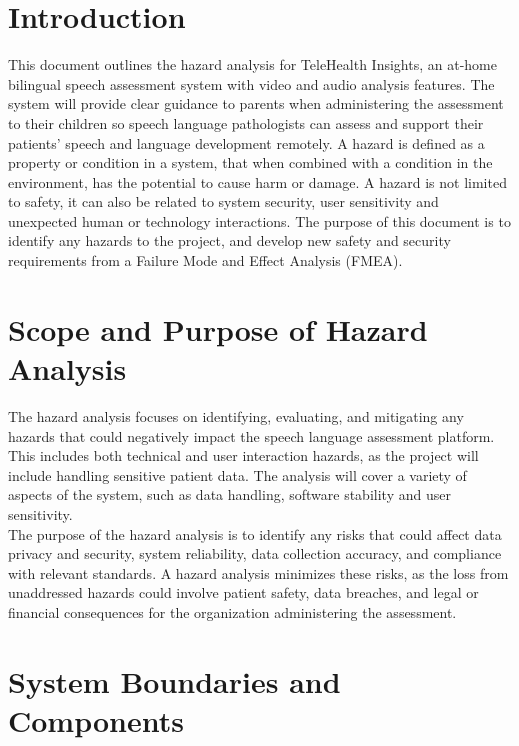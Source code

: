 \documentclass{article}
\begin{document}
\section{Introduction}

\hspace{1.5em} This document outlines the hazard analysis for TeleHealth Insights, an at-home bilingual speech 
assessment system with video and audio analysis features. The system will provide clear guidance to
parents when administering the assessment to their children so speech language pathologists can assess and support
their patients' speech and language development remotely. A hazard is defined as a 
property or condition in a system, that when combined with a condition in the environment, has the potential to cause harm or 
damage. A hazard is not limited to safety, it can also be related to system security, user sensitivity and 
unexpected human or technology interactions. The purpose of this document is to identify any hazards to the project, and 
develop new safety and security requirements from a Failure Mode and Effect Analysis (FMEA).

\section{Scope and Purpose of Hazard Analysis}

\hspace{1.5em} The hazard analysis focuses on identifying, evaluating, and mitigating any hazards that could negatively 
impact the speech language assessment platform. This includes both technical and user interaction hazards,
as the project will include handling sensitive patient data. The analysis will cover a variety of aspects of the system, such as 
data handling, software stability and user sensitivity. \\
\indent The purpose of the hazard analysis is to identify any risks that could 
affect data privacy and security, system reliability, data collection accuracy, and compliance with relevant standards. A 
hazard analysis minimizes these risks, as the loss from unaddressed hazards could involve patient safety, data breaches, 
and legal or financial consequences for the organization administering the assessment.

\section{System Boundaries and Components}
\end{document}
